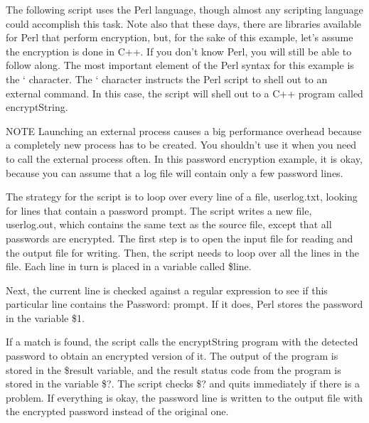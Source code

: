 The following script uses the Perl language, though almost any scripting language could accomplish this task. Note also that these days, there are libraries available for Perl that perform encryption, but, for the sake of this example, let’s assume the encryption is done in C++. If you don’t know Perl, you will still be able to follow along. The most important element of the Perl syntax for this example is the ` character. The ` character instructs the Perl script to shell out to an external command. In this case, the script will shell out to a C++ program called encryptString.

\begin{myNotic}{NOTE}
Launching an external process causes a big performance overhead because a completely new process has to be created. You shouldn’t use it when you need to call the external process often. In this password encryption example, it is okay, because you can assume that a log file will contain only a few password lines.
\end{myNotic}

The strategy for the script is to loop over every line of a file, userlog.txt, looking for lines that contain a password prompt. The script writes a new file, userlog.out, which contains the same text as the source file, except that all passwords are encrypted. The first step is to open the input file for reading and the output file for writing. Then, the script needs to loop over all the lines in the file. Each line in turn is placed in a variable called \$line.

\begin{shell}
open (INPUT, "userlog.txt") or die "Couldn't open input file!";
open (OUTPUT, ">userlog.out") or die "Couldn't open output file!";
while ($line = <INPUT>) {
\end{shell}

Next, the current line is checked against a regular expression to see if this particular line contains the Password: prompt. If it does, Perl stores the password in the variable \$1.

\begin{shell}
    if ($line =˜ m/^Password: (.*)/) {
\end{shell}

If a match is found, the script calls the encryptString program with the detected password to obtain an encrypted version of it. The output of the program is stored in the \$result variable, and the result status code from the program is stored in the variable \$?. The script checks \$? and quits immediately if there is a problem. If everything is okay, the password line is written to the output file with the encrypted password instead of the original one.


